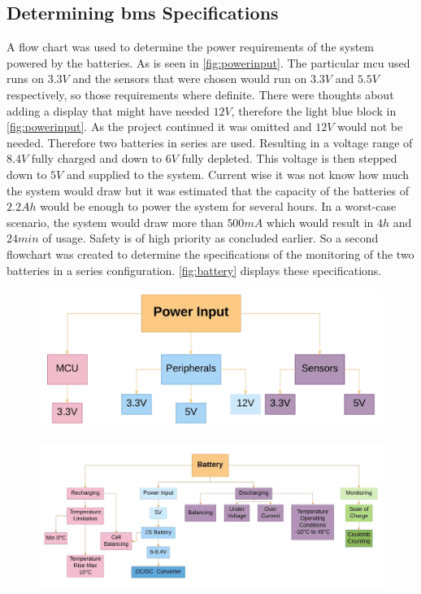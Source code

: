 \subsection{Determining \gls{bms} Specifications}
A flow chart was used to determine the power requirements of the system powered by the batteries. As is seen in \autoref{fig:powerinput}. The particular \gls{mcu} used runs on $3.3V$ and the sensors that were chosen would run on $3.3V$ and $5.5V$ respectively, so those requirements where definite. There were thoughts about adding a display that might have needed $12V$, therefore the light blue block in \autoref{fig:powerinput}. As the project continued it was omitted and $12V$ would not be needed. Therefore two batteries in series are used. Resulting in a voltage range of $8.4V$ fully charged and down to $6V$ fully depleted. This voltage is then stepped down to $5V$ and supplied to the system.
Current wise it was not know how much the system would draw but it was estimated that the capacity of the batteries of $2.2Ah$ would be enough to power the system for several hours.
In a worst-case scenario, the system would draw more than $500mA$ which would result in $4h$ and $24min$ of usage.
Safety is of high priority as concluded earlier. So a second flowchart was created to determine the specifications of the monitoring of the two batteries in a series configuration. \autoref{fig:battery} displays these specifications.

\begin{figure}[H]
	\centering
	\includegraphics[width=\textwidth]{Figures/powerinput.png}
	\label{fig:powerinput}
\end{figure}

\begin{figure}[H]
	\centering
	\includegraphics[width=\textwidth]{Figures/battery.jpg}
	\label{fig:battery}
\end{figure}


